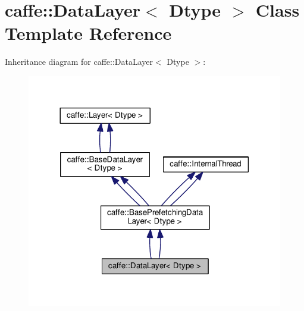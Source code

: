 \hypertarget{classcaffe_1_1_data_layer}{}\section{caffe\+:\+:Data\+Layer$<$ Dtype $>$ Class Template Reference}
\label{classcaffe_1_1_data_layer}


Inheritance diagram for caffe\+:\+:Data\+Layer$<$ Dtype $>$\+:
\nopagebreak
\begin{figure}[H]
\begin{center}
\leavevmode
\includegraphics[width=317pt]{classcaffe_1_1_data_layer__inherit__graph}
\end{center}
\end{figure}
